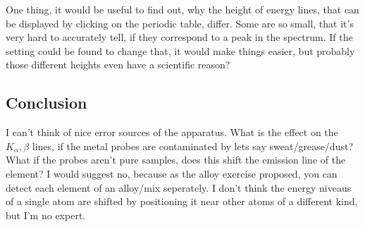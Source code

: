 One thing, it would be useful to find out, why the height of energy lines, that can be displayed by clicking on the periodic table, differ. Some are so small, that it's very hard to accurately tell, if they correspond to a peak in the spectrum. If the setting could be found to change that, it would make things easier, but probably those different heights even have a scientific reason?  

\subsection{Conclusion}
I can't think of nice error sources of the apparatus. What is the effect on the \(K_\alpha,\beta\) lines, if the metal probes are contaminated by lets say sweat/grease/dust? What if the probes aren't pure samples, does this shift the emission line of the element? I would suggest no, because as the alloy exercise proposed, you can detect each element of an alloy/mix seperately. I don't think the energy niveaus of a single atom are shifted by positioning it near other atoms of a different kind, but I'm no expert.
